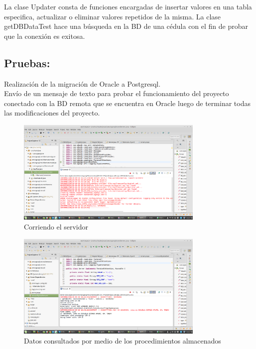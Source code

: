 \documentclass[12pt,oneside]{book}
\begin{document}
	La clase Updater consta de funciones encargadas de insertar valores en una tabla especifica, actualizar o eliminar valores repetidos de la misma. La clase getDBDataTest hace una búsqueda en la BD de una cédula con el fin de probar que la conexión es exitosa.
	
	\subsection{Pruebas:}
	Realización de la migración de Oracle a Postgresql.\\
	
	Envío de un mensaje de texto para probar el funcionamiento del proyecto conectado con la BD remota que se encuentra en Oracle luego de terminar todas las modificaciones del proyecto.
	
	\begin{figure}[H]
		\centering
		\includegraphics[width=0.8\textwidth]{conexion.png}
		\caption{Corriendo el servidor}
		\label{u1}
	\end{figure}


\begin{figure}[H]
	\centering
	\includegraphics[width=0.8\textwidth]{recibido.png}
	\caption{Datos consultados por medio de los procedimientos almacenados}
	\label{l1}
\end{figure}
\end{document}
